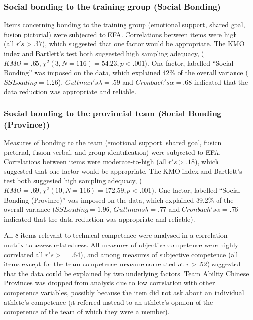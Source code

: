 \begin{CJK}{UTF8}{gbsn}
\subsubsection{Social bonding to the training group (Social Bonding)}
Items concerning bonding to the training group (emotional support, shared goal, fusion pictorial) were subjected to EFA.  Correlations between items were high (all $r's > .37$), which suggested that one factor would be appropriate. The KMO index and Bartlett's test both suggested high sampling adequacy, ($KMO =  .65, \chi^2(3, N = 116) = 54.23, p < .001$).
One factor, labelled ``Social Bonding'' was imposed on the data, which explained 42\% of the overall variance ($SS Loading = 1.26$). $Guttman's \lambda = .59$ and $Cronbach's \alpha = .68$ indicated that the data reduction was appropriate and reliable.

\subsubsection{Social bonding to the provincial team (Social Bonding (Province)) \label{app9:teamBondingEFA}}
Measures of bonding to the team (emotional support, shared goal, fusion pictorial, fusion verbal, and group identification) were subjected to EFA.  Correlations between items were moderate-to-high (all $r's > .18$), which suggested that one factor would be appropriate.
The KMO index and Bartlett's test both suggested high sampling adequacy, ($KMO = .69, \chi^2(10, N = 116) = 172.59, p < .001$).
One factor, labelled ``Social Bonding (Province)'' was imposed on the data, which explained 39.2\% of the overall variance ($SS Loading = 1.96$, $Guttmans \lambda = .77$ and $Cronbach's \alpha = .76$ indicated that the data reduction was appropriate and reliable).

All 8 items relevant to technical competence were analysed in a correlation matrix to assess relatedness. All measures of objective competence were highly correlated all $r's >= .64$),  and among measures of subjective competence (all items except for the team competence measure correlated at $r > .52$) suggested that the data could be explained by two underlying factors. Team Ability Chinese Provinces was dropped from analysis due to low correlation with other competence variables, possibly because the item did not ask about an individual athlete's competence (it referred instead to an athlete's opinion of the competence of the team of which they were a member).


\end{CJK}
